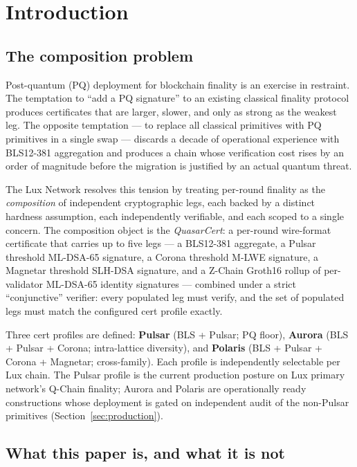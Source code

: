 \section{Introduction}
\label{sec:intro}

\subsection{The composition problem}

Post-quantum (PQ) deployment for blockchain finality is an exercise in
restraint. The temptation to ``add a PQ signature'' to an existing
classical finality protocol produces certificates that are larger,
slower, and only as strong as the weakest leg. The opposite temptation
--- to replace all classical primitives with PQ primitives in a single
swap --- discards a decade of operational experience with BLS12-381
aggregation and produces a chain whose verification cost rises by an
order of magnitude before the migration is justified by an actual
quantum threat.

The Lux Network resolves this tension by treating per-round finality as
the \emph{composition} of independent cryptographic legs, each backed
by a distinct hardness assumption, each independently verifiable, and
each scoped to a single concern. The composition object is the
\emph{QuasarCert}: a per-round wire-format certificate that carries up
to five legs --- a BLS12-381 aggregate, a Pulsar threshold ML-DSA-65
signature, a Corona threshold M-LWE signature, a Magnetar threshold
SLH-DSA signature, and a Z-Chain Groth16 rollup of per-validator
ML-DSA-65 identity signatures --- combined under a strict
``conjunctive'' verifier: every populated leg must verify, and the set
of populated legs must match the configured cert profile exactly.

Three cert profiles are defined: \textbf{Pulsar} (BLS + Pulsar; PQ
floor), \textbf{Aurora} (BLS + Pulsar + Corona; intra-lattice
diversity), and \textbf{Polaris} (BLS + Pulsar + Corona + Magnetar;
cross-family). Each profile is independently selectable per Lux chain.
The Pulsar profile is the current production posture on Lux primary
network's Q-Chain finality; Aurora and Polaris are operationally ready
constructions whose deployment is gated on independent audit of the
non-Pulsar primitives (Section~\ref{sec:production}).

\subsection{What this paper is, and what it is not}

